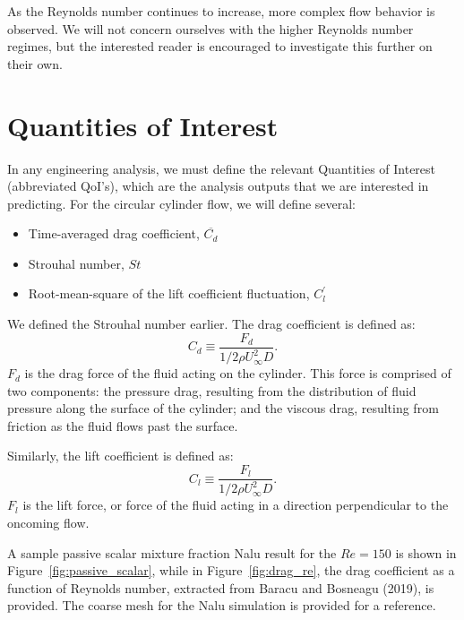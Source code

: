 \documentclass{article}
\begin{document}
As the Reynolds number continues to increase, more complex flow
behavior is observed.  We will not concern ourselves with the higher
Reynolds number regimes, but the interested reader is encouraged to
investigate this further on their own.

\section*{Quantities of Interest}
In any engineering analysis, we must define the relevant Quantities
of Interest (abbreviated QoI's), which are the analysis outputs that
we are interested in predicting. For the circular cylinder flow, we will
define several:
\begin{itemize}
  \item Time-averaged drag coefficient, $\overline{C_d}$
  \item Strouhal number, $St$
  \item Root-mean-square of the lift coefficient fluctuation,
    $C^\prime_l$
\end{itemize}

We defined the Strouhal number earlier.  The drag coefficient is
defined as:
\begin{equation}
  C_d \equiv \frac{F_d}{1/2 \rho U_\infty^2 D}.
\end{equation}
$F_d$ is the drag force of the fluid acting on the cylinder.  This
force is comprised of two components: the pressure drag, resulting
from the distribution of fluid pressure along the surface of the
cylinder; and the viscous drag, resulting from friction as the fluid
flows past the surface.

Similarly, the lift coefficient is defined as:
\begin{equation}
  C_l \equiv \frac{F_l}{1/2 \rho U_\infty^2 D}.
\end{equation}
$F_l$ is the lift force, or force of the fluid acting in a direction
perpendicular to the oncoming flow.


A sample passive scalar mixture fraction Nalu result for the $Re = 150$ is shown in Figure~\ref{fig:passive_scalar},
while in Figure~\ref{fig:drag_re}, the drag coefficient as a function of Reynolds number, extracted from 
Baracu and Bosneagu (2019), is provided. The coarse mesh for the Nalu simulation is provided for a reference.
\end{document}
